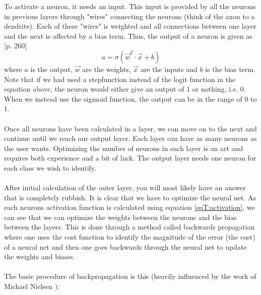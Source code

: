 To activate a neuron, it needs an input. This input is provided by all the neurons in previous layers through "wires" connecting the neurons (think of the axon to a dendrite). Each of these "wires" is weighted and all connections between one layer and the next is affected by a bias term. Thus, the output of a neuron is given as \cite{Geron}[p. 260]
\begin{equation}
a = \sigma(\vec{w}^T \cdot \vec{x} + b)
\label{eqT:activation}
\end{equation}
where $a$ is the output, $\vec{w}$ are the weights, $\vec{x}$ are the inputs and $b$ is the bias term. Note that if we had used a stepfunction instead of the logit function in the equation above, the neuron would either give an output of 1 or nothing, i.e. 0. When we instead use the sigmoid function, the output can be in the range of 0 to 1. \\ \\
Once all neurons have been calculated in a layer, we can move on to the next and continue until we reach our output layer. Each layer can have as many neurons as the user wants. Optimizing the number of neurons in each layer is an art and requires both experience and a bit of luck. The output layer needs one neuron for each class we wish to identify. \\ \\
After initial calculation of the outer layer, you will most likely have an answer that is completely rubbish. It is clear that we have to optimize the neural net. As each neurons activation function is calculated using equation \eqref{eqT:activation}, we can see that we can optimize the weights between the neurons and the bias between the layers. This is done through a method called backwards propagation where one uses the cost function to identify the magnitude of the error (the cost) of a neural net and then one goes backwards through the neural net to update the weights and biases. \\ \\
The basic procedure of backpropagation is this (heavily influenced by the work of Michael Nielsen \cite{Nielsen}):
